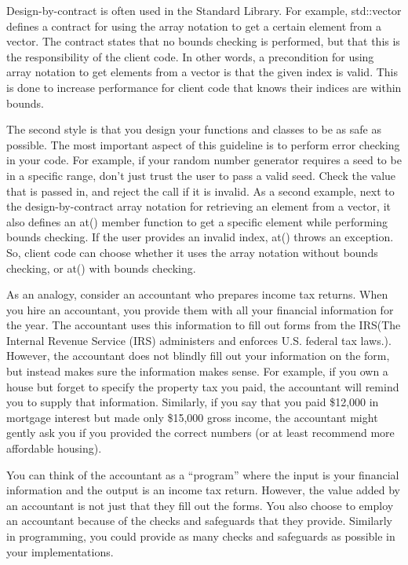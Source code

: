 Design-by-contract is often used in the Standard Library. For example, std::vector defines a contract for using the array notation to get a certain element from a vector. The contract states that no bounds checking is performed, but that this is the responsibility of the client code. In other words, a precondition for using array notation to get elements from a vector is that the given index is valid.
This is done to increase performance for client code that knows their indices are within bounds.

The second style is that you design your functions and classes to be as safe as possible. The most important aspect of this guideline is to perform error checking in your code. For example, if your random number generator requires a seed to be in a specific range, don’t just trust the user to pass a valid seed. Check the value that is passed in, and reject the call if it is invalid. As a second example, next to the design-by-contract array notation for retrieving an element from a vector, it also defines an at() member function to get a specific element while performing bounds checking. If the user provides an invalid index, at() throws an exception. So, client code can choose whether it uses the array notation without bounds checking, or at() with bounds checking.

As an analogy, consider an accountant who prepares income tax returns. When you hire an accountant, you provide them with all your financial information for the year. The accountant uses this information to fill out forms from the IRS(The Internal Revenue Service (IRS) administers and enforces U.S. federal tax laws.). However, the accountant does not blindly fill out your information on the form, but instead makes sure the information makes sense. For example, if you own a house but forget to specify the property tax you paid, the accountant will remind you to supply that information. Similarly, if you say that you paid \$12,000 in mortgage interest but made only \$15,000 gross income, the accountant might gently ask you if you provided the correct numbers (or at least recommend more affordable housing).

You can think of the accountant as a “program” where the input is your financial information and the output is an income tax return. However, the value added by an accountant is not just that they fill out the forms. You also choose to employ an accountant because of the checks and safeguards that they provide. Similarly in programming, you could provide as many checks and safeguards as possible in your implementations.

